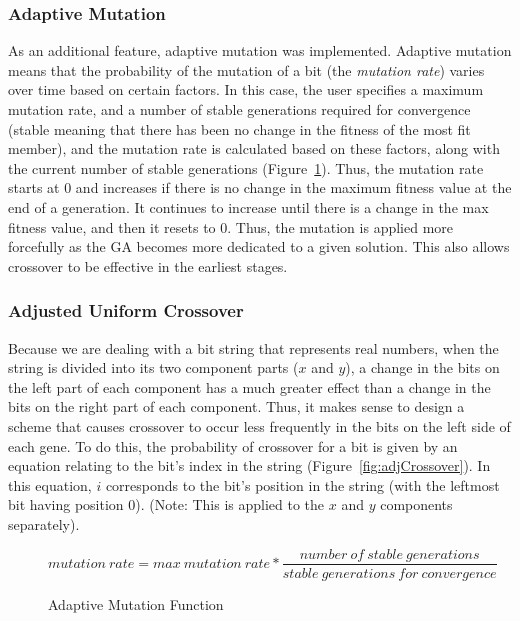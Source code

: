 \documentclass[12pt,fleqn]{article}
\begin{document}
\subsubsection{Adaptive Mutation}
As an additional feature, adaptive mutation was implemented. Adaptive mutation means that
the probability of the mutation of a bit (the {\em mutation rate}) varies over time based
on certain factors.  In this case, the user specifies a maximum mutation rate, and a 
number of stable generations required for convergence (stable meaning that there has been
no change in the fitness of the most fit member), and the mutation rate is calculated 
based on these factors, along with the current number of stable generations
(Figure~\ref{fig:adaptiveMut}). Thus, the mutation rate starts at 0 and increases if there
is no change in the maximum fitness value at the end of a generation.  It continues to
increase until there is a change in the max fitness value, and then it resets to 0.  Thus,
the mutation is applied more forcefully as the GA becomes more dedicated to a given 
solution.  This also allows crossover to be effective in the earliest stages.

\subsubsection{Adjusted Uniform Crossover}
Because we are dealing with a bit string that represents real numbers, when the string
is divided into its two component parts ($x$ and $y$), a change in the bits on the left
part of each component has a much greater effect than a change in the bits on the right
part of each component.  Thus, it makes sense to design a scheme that causes crossover
to occur less frequently in the bits on the left side of each gene.  To do this, the 
probability of crossover for a bit is given by an equation relating to the bit's index
in the string (Figure~\ref{fig:adjCrossover}). In this equation, $i$ corresponds to the
bit's position in the string (with the leftmost bit having position 0). (Note: This is
applied to the $x$ and $y$ components separately).

\begin{figure}
\begin{center}
$$mutation\ rate = max\ mutation\ rate * \frac{number\ of\ stable\ generations}{stable\ generations\ for\ convergence}$$
\end{center}
\caption{Adaptive Mutation Function}
\label{fig:adaptiveMut}
\end{figure}
\end{document}
